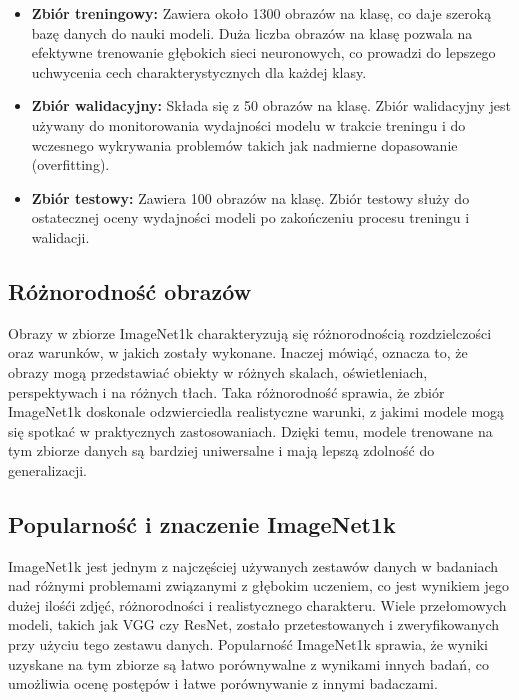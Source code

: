 \begin{itemize}
    \item \textbf{Zbiór treningowy:} Zawiera około 1300 obrazów na klasę, co daje szeroką bazę danych do nauki modeli. 
    Duża liczba obrazów na klasę pozwala na efektywne trenowanie głębokich sieci neuronowych, co prowadzi do lepszego 
    uchwycenia cech charakterystycznych dla każdej klasy.
    \item \textbf{Zbiór walidacyjny:} Składa się z 50 obrazów na klasę. Zbiór walidacyjny jest używany do monitorowania 
    wydajności modelu w trakcie treningu i do wczesnego wykrywania problemów takich jak nadmierne dopasowanie 
    (overfitting).
    \item \textbf{Zbiór testowy:} Zawiera 100 obrazów na klasę. Zbiór testowy służy do ostatecznej oceny wydajności 
    modeli po zakończeniu procesu treningu i walidacji.
\end{itemize}

\subsection*{Różnorodność obrazów}

Obrazy w zbiorze ImageNet1k charakteryzują się różnorodnością rozdzielczości oraz warunków, w jakich zostały wykonane. Inaczej mówiąć, oznacza to, że obrazy mogą przedstawiać obiekty w różnych skalach, oświetleniach, perspektywach i na 
różnych tłach. Taka różnorodność sprawia, że zbiór ImageNet1k doskonale odzwierciedla realistyczne warunki, z jakimi modele mogą się spotkać w praktycznych zastosowaniach. Dzięki temu, modele trenowane na tym zbiorze danych są bardziej 
uniwersalne i mają lepszą zdolność do generalizacji. 

\subsection*{Popularność i znaczenie ImageNet1k}

ImageNet1k jest jednym z najczęściej używanych zestawów danych w badaniach nad różnymi problemami związanymi z głębokim uczeniem, co jest wynikiem jego dużej ilośći zdjęć, różnorodności i realistycznego charakteru. Wiele przełomowych modeli, 
takich jak VGG czy ResNet, zostało przetestowanych i zweryfikowanych przy użyciu tego zestawu danych. Popularność ImageNet1k sprawia, że wyniki uzyskane na tym zbiorze są łatwo porównywalne z wynikami innych badań, co umożliwia ocenę 
postępów i łatwe porównywanie z innymi badaczami.


